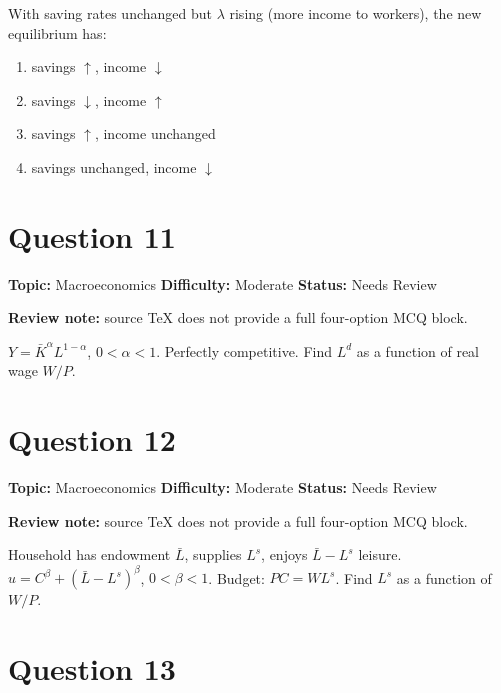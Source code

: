 \documentclass[11pt]{article}
\begin{document}
With saving rates unchanged but $\lambda$ rising (more income to workers), the new equilibrium has:
\begin{enumerate}[label=(\Alph*)]
\item savings $\uparrow$, income $\downarrow$
\item savings $\downarrow$, income $\uparrow$
\item savings $\uparrow$, income unchanged
\item savings unchanged, income $\downarrow$
\end{enumerate}

\newpage

\section*{Question 11}


\noindent\textbf{Topic:} Macroeconomics \quad \textbf{Difficulty:} Moderate \quad \textbf{Status:} Needs Review

\par\noindent\textcolor{StatAmber}{\textbf{Review note:} source TeX does not provide a full four-option MCQ block.}


$Y=\bar K^\alpha L^{1-\alpha}$, $0<\alpha<1$. Perfectly competitive. Find $L^d$ as a function of real wage $W/P$.

\newpage

\section*{Question 12}


\noindent\textbf{Topic:} Macroeconomics \quad \textbf{Difficulty:} Moderate \quad \textbf{Status:} Needs Review

\par\noindent\textcolor{StatAmber}{\textbf{Review note:} source TeX does not provide a full four-option MCQ block.}


Household has endowment $\bar L$, supplies $L^s$, enjoys $\bar L-L^s$ leisure. $u=C^\beta+(\bar L-L^s)^\beta$, $0<\beta<1$. Budget: $PC=WL^s$. Find $L^s$ as a function of $W/P$.

\newpage

\section*{Question 13}
\end{document}
